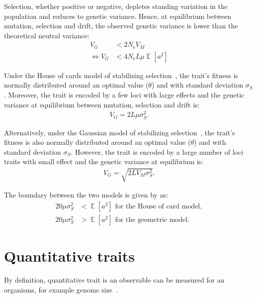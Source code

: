 \documentclass{article}
\DeclareMathOperator{\E}{\mathbb{E}}
\newcommand{\Ne}{N_{\text{e}}}
\newcommand{\VarGenetic}{V_{G}}
\newcommand{\VarMutation}{V_{M}}
\newcommand{\StdSelection}{\sigma}
\newcommand{\VarSelection}{\StdSelection^2}
\newcommand{\MutationRate}{\mu}
\newcommand{\NbrLoci}{L}
\begin{document}
Selection, whether positive or negative, depletes standing variation in the population and reduces to genetic variance. Hence, at equilibrium between mutation, selection and drift, the observed genetic variance is lower than the theoretical neutral variance:
\begin{align}
    \VarGenetic & < 2 \Ne \VarMutation \\
    \iff \VarGenetic & < 4 \Ne \NbrLoci \MutationRate \E \left[ a^2 \right]
\end{align}

Under the House of cards model of stabilizing selection~\citep{kingman_simple_1978}, the trait's fitness is normally distributed around an optimal value ($\theta$) and with standard deviation $\StdSelection_S$. Moreover, the trait is encoded by a few loci with large effects and the genetic variance at equilibrium between mutation, selection and drift is: 
\begin{gather}
    \VarGenetic = 2 \NbrLoci \MutationRate \VarSelection_S \label{eq-mutsel-HC}.
\end{gather}

Alternatively, under the Gaussian model of stabilizing selection~\citep{lande_natural_1976}, the trait's fitness is also normally distributed around an optimal value ($\theta$) and with standard deviation $\StdSelection_S$. However, the trait is encoded by a large number of loci traits with small effect and the genetic variance at equilibrium is: 
\begin{gather}
    \VarGenetic = \sqrt{2 \NbrLoci \VarMutation \VarSelection_S} \label{eq-mutsel-G}.
\end{gather}

The boundary between the two models is given by \citet{turelli_heritable_1984} as:
\begin{align}
    20 \MutationRate \VarSelection_S &< \E \left[ a^2 \right] \text{ for the House of card model}, \\
    20 \MutationRate \VarSelection_S &> \E \left[ a^2 \right] \text{ for the geometric model}.
\end{align}

\section{Quantitative traits}

By definition, quantitative trait is an observable can be measured for an organisms, for example genome size~\citep{alfsnes_genome_2017}.
\end{document}
